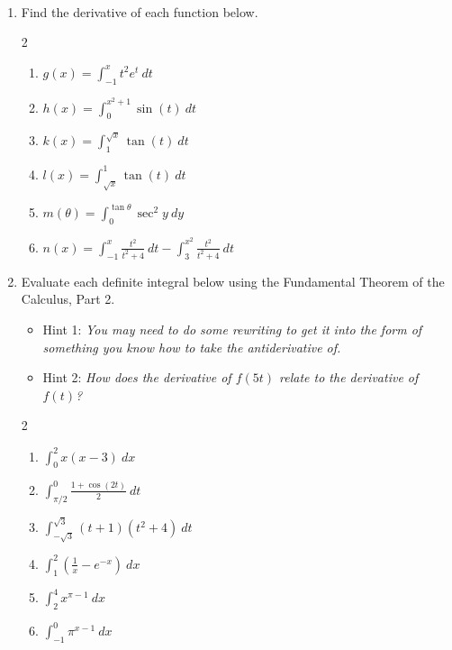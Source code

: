 \documentclass[11pt,fleqn]{article}
\renewcommand{\d}{\displaystyle}
\begin{document}
\vspace*{-0.7in}

\begin{center}
  \Large{}\\
  \end{center}
\begin{enumerate}
\item Find the derivative of each function below.
	\begin{multicols}{2}
	\begin{enumerate}
	\item $\d g(x)=\int_{-1}^x t^2e^t\: dt$
	\item $\d h(x)=\int_0^{x^2+1} \sin(t) \: dt$
	\item $\d k(x)=\int_{1}^{\sqrt{x}}\tan(t)\: dt$
	\item $\d l(x)=\int_{\sqrt{x}}^{1}\tan(t)\: dt$
	\item $\d m(\theta)=\int_{0}^{\tan\theta}\sec^{2}y\: dy$
	\item $\d n(x)=\int_{-1}^{x}\frac{t^{2}}{t^{2}+4}\: dt -\int_{3}^{x^{2}}\frac{t^{2}}{t^{2}+{4}}\: dt$
	\end{enumerate}
	\end{multicols}
\vfill
\newpage
\item Evaluate each definite integral below using the Fundamental Theorem of the Calculus, Part 2. 

\begin{itemize} 
\item Hint 1: \emph{You may need to do some rewriting to get it into the form of something you know how to take the antiderivative of.}
\item Hint 2: \emph{How does the derivative of $f(5t)$ relate to the derivative of $f(t)$?}
\end{itemize}
	\begin{multicols}{2}
	\begin{enumerate}
	\item $\d \int_{0}^{2} x(x-3)\: dx$
	\item $\d \int_{\pi/2}^{0}\frac{1+\cos (2t)}{2}\: dt$ 	\item $\d \int_{-\sqrt{3}}^{\sqrt{3}}(t+1)(t^{2}+4)\: dt$
	\item $\d \int_{1}^{2}\left(\frac{1}{x}-e^{-x}\right)\: dx$
	\item $\d \int_{2}^{4}x^{\pi-1}\: dx$
	\item $\d \int_{-1}^{0}\pi^{x-1}\: dx$
	\end{enumerate}
	\end{multicols}



\end{enumerate}
\end{document}
